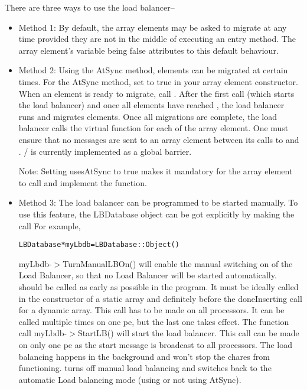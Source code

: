 There are three ways to use the load balancer-- 
\begin{itemize}

\item Method 1: By default, the array elements may be asked to migrate at any time
provided they are not in the middle of executing an entry method. 
The array element's variable  being false attributes
to this default behaviour. 

\item  Method 2: Using the AtSync method, elements can be migrated at certain
times.  For the AtSync method, set  to true in your 
array element constructor.  When an element is ready to migrate,
call .  
After the first  call (which starts the load balancer)
and once all elements have reached ,
the load balancer runs and migrates elements.  Once
all migrations are complete, the load balancer calls the 
virtual function  for each of the
array element.  One must ensure that no messages are
sent to an array element between its calls to  and
. / is currently
implemented as a global barrier.

Note: Setting usesAtSync to true makes it mandatory for the array
element to call  and implement the 
 function.

\item Method 3: The load balancer can be programmed to be started
manually. 
 To use this feature, the LBDatabase object
can be got explicitly by making the call 
For example, 

\begin{alltt}
LBDatabase * myLbdb = LBDatabase::Object()
\end{alltt}

{\kw myLbdb-$>$TurnManualLBOn()} will enable the manual switching on of
the Load Balancer, so that no Load Balancer will be started automatically.
 should be called as early as possible in the
program. It must be ideally called in the constructor of a static array and
definitely before the doneInserting call for a dynamic array.  This call 
has to be made on all processors. It can be called multiple times on one 
pe, but the last one takes effect.   
The function call {\kw myLbdb-$>$StartLB()} will start the load balancer. 
This call can be made on only one pe as the start message is broadcast 
to all processors. The load balancing happens in the background and 
won't stop the chares from functioning. 
 turns off manual load balancing and switches back to the automatic Load balancing mode (using or not using AtSync). 

\end{itemize}


